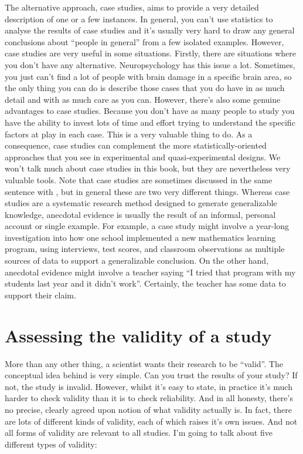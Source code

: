 The alternative approach, case studies, aims to provide a very detailed description of one or a few instances. In general, you can't use statistics to analyse the results of case studies and it's usually very hard to draw any general conclusions about ``people in general'' from a few isolated examples. However, case studies are very useful in some situations. Firstly, there are situations where you don't have any alternative. Neuropsychology has this issue a lot. Sometimes, you just can't find a lot of people with brain damage in a specific brain area, so the only thing you can do is describe those cases that you do have in as much detail and with as much care as you can. However, there's also some genuine advantages to case studies. Because you don't have as many people to study you have the ability to invest lots of time and effort trying to understand the specific factors at play in each case. This is a very valuable thing to do. As a consequence, case studies can complement the more statistically-oriented approaches that you see in experimental and quasi-experimental designs. We won't talk much about case studies in this book, but they are nevertheless very valuable tools. Note that case studies are sometimes discussed in the same sentence with , but in general these are two very different things. Whereas case studies are a systematic research method designed to generate generalizable knowledge, anecdotal evidence is usually the result of an informal, personal account or single example. For example, a case study might involve a year-long investigation into how one school implemented a new mathematics learning program, using interviews, test scores, and classroom observations as multiple sources of data to support a generalizable conclusion. On the other hand, anecdotal evidence might involve a teacher saying ``I tried that program with my students last year and it didn't work''. Certainly, the teacher has some data to support their claim.


\section{Assessing the validity of a study~\label{sec:validity}}

More than any other thing, a scientist wants their research to be ``valid''. The conceptual idea behind  is very simple. Can you trust the results of your study? If not, the study is invalid. However, whilst it's easy to state, in practice it's much harder to check validity than it is to check reliability. And in all honesty, there's no precise, clearly agreed upon notion of what validity actually is. In fact, there are lots of different kinds of validity, each of which raises it's own issues. And not all forms of validity are relevant to all studies. I'm going to talk about five different types of validity:

